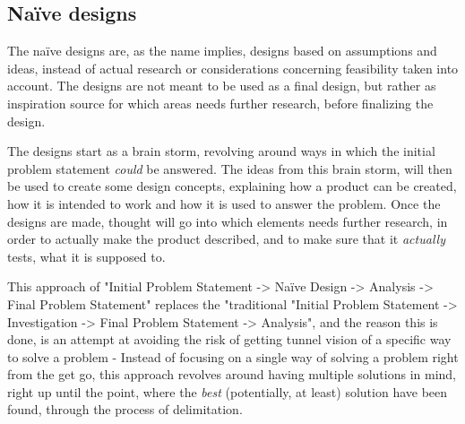 
\subsection{Naïve designs}
The naïve designs are, as the name implies, designs based on assumptions and ideas, instead of actual research or considerations concerning feasibility taken into account. The designs are not meant to be used as a final design, but rather as inspiration source for which areas needs further research, before finalizing the design.
\bigskip

The designs start as a brain storm, revolving around ways in which the initial problem statement \textit{could} be answered. The ideas from this brain storm, will then be used to create some design concepts, explaining how a product can be created, how it is intended to work and how it is used to answer the problem. Once the designs are made, thought will go into which elements needs further research, in order to actually make the product described, and to make sure that it \textit{actually} tests, what it is supposed to.
\bigskip

This approach of "Initial Problem Statement -> Naïve Design -> Analysis -> Final Problem Statement" replaces the "traditional "Initial Problem Statement -> Investigation -> Final Problem Statement -> Analysis", and the reason this is done, is an attempt at avoiding the risk of getting tunnel vision of a specific way to solve a problem - Instead of focusing on a single way of solving a problem right from the get go, this approach revolves around having multiple solutions in mind, right up until the point, where the \textit{best} (potentially, at least) solution have been found, through the process of delimitation.
